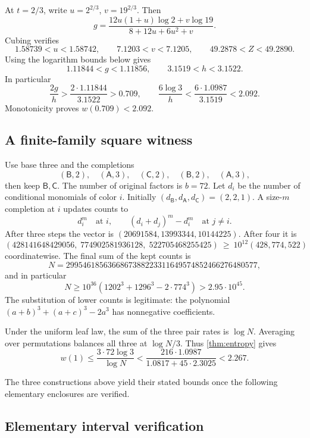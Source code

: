\documentclass[11pt]{article}
\numberwithin{equation}{section}
\theoremstyle{definition}
\theoremstyle{remark}
\begin{document}
At \(t=2/3\), write \(u=2^{2/3}\), \(v=19^{2/3}\).
Then
\[
 g=\frac{12u(1+u)\log2+v\log19}{8+12u+6u^2+v}.
\]
Cubing verifies
\[
 1.58739<u<1.58742,\qquad
 7.1203<v<7.1205,\qquad
 49.2878<Z<49.2890.
\]
Using the logarithm bounds below gives
\[
 1.11844<g<1.11856,\qquad 3.1519<h<3.1522.
\]
In particular
\[
 \frac{2g}{h}>
 \frac{2\cdot1.11844}{3.1522}>0.709,\qquad
 \frac{6\log3}{h}<
 \frac{6\cdot1.0987}{3.1519}<2.092 .
\]
Monotonicity proves \(w(0.709)<2.092\).

\subsection{A finite-family square witness}\label{subsec:square}

Use base three and the completions
\[
 (\mathsf B,2),\quad(\mathsf A,3),\quad(\mathsf C,2),\quad
 (\mathsf B,2),\quad(\mathsf A,3),
\]
then keep \(\mathsf B,\mathsf C\).
The number of original factors is \(b=72\).
Let \(d_i\) be the number of conditional monomials of color \(i\).
Initially \((d_{\mathsf B},d_{\mathsf A},d_{\mathsf C})=(2,2,1)\).
A size-\(m\) completion at \(i\) updates counts to
\[
 d_i^m\quad\text{at }i,\qquad
 (d_i+d_j)^m-d_i^m\quad\text{at }j\ne i.
\]
After three steps the vector is
\((20691584,13993344,10144225)\).
After four it is
\[
 (428141648429056,\;774902581936128,\;522705468255425)
 \ \ge\ 10^{12}(428,774,522)
\]
coordinatewise.
The final sum of the kept counts is
\[
 N=2995461856366867388223311649574852466276480577,
\]
and in particular
\begin{equation}\label{eq:square-count-lower}
 N\ge 10^{36}
      (1202^3+1296^3-2\cdot774^3)>2.95\cdot10^{45}.
\end{equation}
The substitution of lower counts is legitimate: the polynomial
\((a+b)^3+(a+c)^3-2a^3\) has nonnegative coefficients.

Under the uniform leaf law, the sum of the three pair rates is
\(\log N\).
Averaging over permutations balances all three at \(\log N/3\).
Thus \cref{thm:entropy} gives
\[
 w(1)\le \frac{3\cdot72\log3}{\log N}
 <\frac{216\cdot1.0987}{1.0817+45\cdot2.3025}
 <2.267.
\]

  The three constructions above yield their stated bounds
once the following elementary enclosures are verified.

\subsection{Elementary interval verification}\label{subsec:log-certificate}
\end{document}
